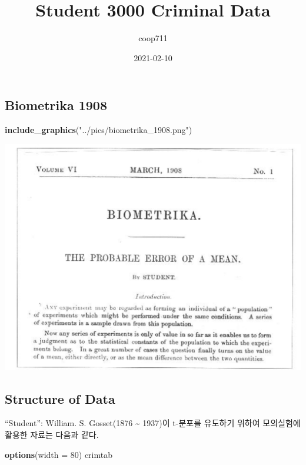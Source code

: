 \documentclass[
]{article}
\title{Student 3000 Criminal Data}
\author{coop711}
\date{2021-02-10}
\newenvironment{Shaded}{\begin{snugshade}}{\end{snugshade}}
\newcommand{\DataTypeTok}[1]{\textcolor[rgb]{0.13,0.29,0.53}{#1}}
\newcommand{\DecValTok}[1]{\textcolor[rgb]{0.00,0.00,0.81}{#1}}
\newcommand{\KeywordTok}[1]{\textcolor[rgb]{0.13,0.29,0.53}{\textbf{#1}}}
\newcommand{\NormalTok}[1]{#1}
\newcommand{\StringTok}[1]{\textcolor[rgb]{0.31,0.60,0.02}{#1}}
\begin{document}
\maketitle

\hypertarget{biometrika-1908}{%
\subsection{Biometrika 1908}\label{biometrika-1908}}

\begin{Shaded}
\begin{Highlighting}[]
\KeywordTok{include_graphics}\NormalTok{(}\StringTok{"../pics/biometrika_1908.png"}\NormalTok{)}
\end{Highlighting}
\end{Shaded}

\includegraphics[width=0.67\linewidth]{../pics/biometrika_1908}

\hypertarget{structure-of-data}{%
\subsection{Structure of Data}\label{structure-of-data}}

``Student'': William. S. Gosset(1876 \textasciitilde{} 1937)이 t-분포를
유도하기 위하여 모의실험에 활용한 자료는 다음과 같다.

\begin{Shaded}
\begin{Highlighting}[]
\KeywordTok{options}\NormalTok{(}\DataTypeTok{width =} \DecValTok{80}\NormalTok{)}
\NormalTok{crimtab}
\end{Highlighting}
\end{Shaded}
\end{document}
